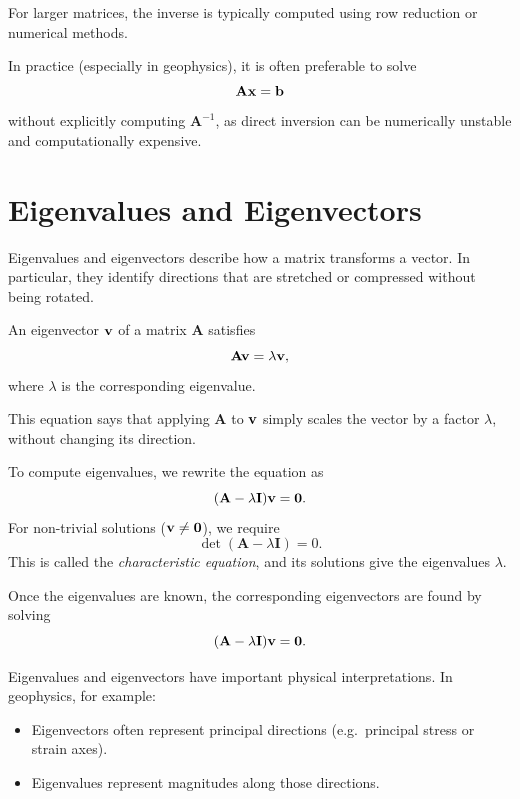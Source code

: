 For larger matrices, the inverse is typically computed using row reduction or
numerical methods.

In practice (especially in geophysics), it is often preferable to solve
\begin{equation}
    \mathbf{A}\vb{x} = \vb{b}
\end{equation}
without explicitly computing $\mathbf{A}^{-1}$, as direct inversion can be
numerically unstable and computationally expensive.

\section{Eigenvalues and Eigenvectors}

Eigenvalues and eigenvectors describe how a matrix transforms a vector. In
particular, they identify directions that are stretched or compressed without
being rotated.

An eigenvector $\vb{v}$ of a matrix $\mathbf{A}$ satisfies
\begin{equation}
    \mathbf{A} \vb{v} = \lambda \vb{v},
\end{equation}
where $\lambda$ is the corresponding eigenvalue.

This equation says that applying $\mathbf{A}$ to $\vb{v}$ simply scales the
vector by a factor $\lambda$, without changing its direction.

To compute eigenvalues, we rewrite the equation as
\begin{equation}
    (\mathbf{A} - \lambda \mathbf{I}) \vb{v} = \vb{0}.
\end{equation}
For non-trivial solutions ($\vb{v} \neq \vb{0}$), we require
\begin{equation}
    \det(\mathbf{A} - \lambda \mathbf{I}) = 0.
\end{equation}
This is called the \emph{characteristic equation}, and its solutions give the
eigenvalues $\lambda$.

Once the eigenvalues are known, the corresponding eigenvectors are found by
solving
\begin{equation}
    (\mathbf{A} - \lambda \mathbf{I}) \vb{v} = \vb{0}.
\end{equation}

Eigenvalues and eigenvectors have important physical interpretations. In
geophysics, for example:
\begin{itemize}
    \item Eigenvectors often represent principal directions (e.g.\ principal
    stress or strain axes).
    \item Eigenvalues represent magnitudes along those directions.
\end{itemize}

